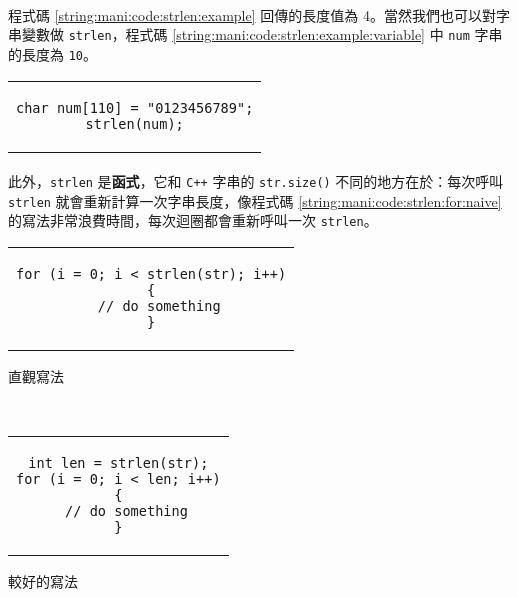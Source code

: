 \documentclass[12pt,a4paper,oneside]{article}
\begin{document}
\begin{CJK}{UTF8}{bkai}
\paragraph{}程式碼 \ref{string:mani:code:strlen:example} 回傳的長度值為 4。當然我們也可以對字串變數做 \lstinline!strlen!，程式碼 \ref{string:mani:code:strlen:example:variable} 中 \lstinline!num! 字串的長度為 \lstinline!10!。

\begin{code}[h!]
  \centering
  \begin{tabular}{c}
  \begin{lstlisting}
char num[110] = "0123456789";
strlen(num);
  \end{lstlisting}
  \end{tabular}
  \caption{\lstinline!strlen! 範例}
  \label{string:mani:code:strlen:example:variable}
\end{code}

\paragraph{}此外，\lstinline!strlen! 是{\color{blue}\textbf{函式}}，它和 \texttt{C++} 字串的 \lstinline!str.size()! 不同的地方在於：每次呼叫 \lstinline!strlen! 就會重新計算一次字串長度，像程式碼 \ref{string:mani:code:strlen:for:naive} 的寫法非常浪費時間，每次迴圈都會重新呼叫一次 \lstinline!strlen!。

\begin{code}[h!]
  \centering
  \begin{subcode}{.58\textwidth}
    \centering
    \begin{tabular}{c}
    \begin{lstlisting}
for (i = 0; i < strlen(str); i++)
{
  // do something
}
    \end{lstlisting}
    \end{tabular}
    \caption{直觀寫法}
    \label{string:mani:code:strlen:for:naive}
  \end{subcode}
  ~
  \begin{subcode}{.38\textwidth}
    \centering
    \begin{tabular}{c}
    \begin{lstlisting}
int len = strlen(str);
for (i = 0; i < len; i++)
{
  // do something
}
    \end{lstlisting}
    \end{tabular}
    \caption{較好的寫法}
    \label{string:mani:code:strlen:for:better}
  \end{subcode}
  \caption{注意 \lstinline!strlen! 的用法}
  \label{string:mani:code:strlen:for}
\end{code}


\end{CJK}
\end{document}
